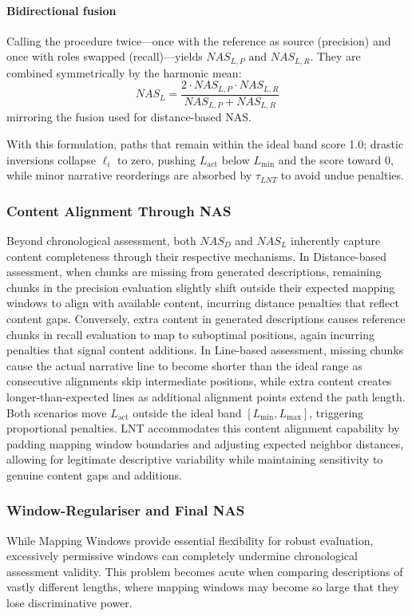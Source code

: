 \documentclass[main.tex]{subfiles}
\begin{document}
\paragraph{Bidirectional fusion}
Calling the procedure twice—once with the reference as source (precision) and once with roles swapped (recall)—yields $NAS_{L,P}$ and $NAS_{L,R}$. They are combined symmetrically by the harmonic mean:
\begin{equation}
NAS_L = \frac{2 \cdot NAS_{L,P} \cdot NAS_{L,R}}{NAS_{L,P} + NAS_{L,R}}
\end{equation}
mirroring the fusion used for distance-based NAS.

With this formulation, paths that remain within the ideal band score 1.0; drastic inversions collapse $\ell_i$ to zero, pushing $L_{\text{act}}$ below $L_{\min}$ and the score toward 0, while minor narrative reorderings are absorbed by $\tau_{LNT}$ to avoid undue penalties.

\subsubsection{Content Alignment Through NAS}
Beyond chronological assessment, both $NAS_D$ and $NAS_L$ inherently capture content completeness through their respective mechanisms. In Distance-based assessment, when chunks are missing from generated descriptions, remaining chunks in the precision evaluation slightly shift outside their expected mapping windows to align with available content, incurring distance penalties that reflect content gaps. Conversely, extra content in generated descriptions causes reference chunks in recall evaluation to map to suboptimal positions, again incurring penalties that signal content additions. In Line-based assessment, missing chunks cause the actual narrative line to become shorter than the ideal range as consecutive alignments skip intermediate positions, while extra content creates longer-than-expected lines as additional alignment points extend the path length. Both scenarios move $L_{\text{act}}$ outside the ideal band $[L_{\min}, L_{\max}]$, triggering proportional penalties. LNT accommodates this content alignment capability by padding mapping window boundaries and adjusting expected neighbor distances, allowing for legitimate descriptive variability while maintaining sensitivity to genuine content gaps and additions.

\subsubsection{Window-Regulariser and Final NAS}
While Mapping Windows provide essential flexibility for robust evaluation, excessively permissive windows can completely undermine chronological assessment validity. This problem becomes acute when comparing descriptions of vastly different lengths, where mapping windows may become so large that they lose discriminative power.
\end{document}

